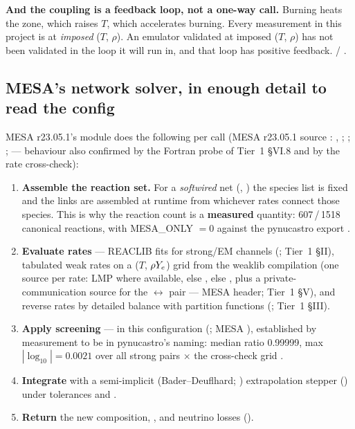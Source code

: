 \textbf{And the coupling is a feedback loop, not a one-way call.} Burning heats
the zone, which raises $T$, which accelerates burning. Every measurement in this
project is at \emph{imposed} ($T$, $\rho$). An emulator validated at imposed
($T$, $\rho$) has not been validated in the loop it will run in, and that loop
has positive feedback.  / .

\subsection{MESA's network solver, in enough detail to read the config}
\label{sec:netsolver}

MESA r23.05.1's  module does the following per call (MESA r23.05.1
source \citep{mesa}:  ,
 ;
; \citealt[\S 6]{paxton2011};
\citealt[\S 10.2]{jermyn2023} --- behaviour also confirmed by the Fortran probe
of Tier~1 \S VI.8 and by the rate cross-check):

\begin{enumerate}
\item \textbf{Assemble the reaction set.} For a \emph{softwired} net
  (, ) the species list is fixed and the
  links are assembled at runtime from whichever rates connect those species.
  This is why the reaction count is a \textbf{measured} quantity: 607\,/\,1518
  canonical reactions, with MESA\_ONLY $= 0$ against the pynucastro export
  .
\item \textbf{Evaluate rates} --- REACLIB fits for strong/EM channels
  (\citealt{cyburt2010}; Tier~1 \S II), tabulated weak rates on a
  ($T$, $\rho Y_{e}$) grid from the weaklib compilation (one source per rate: LMP
  where available, else \citealt{oda1994}, else \citealt{fuller1985}, plus a
  private-communication source for the $\leftrightarrow$
  pair --- MESA  header; Tier~1
  \S V), and reverse rates by detailed balance with partition functions
  (; Tier~1 \S III).
\item \textbf{Apply screening} ---  in this configuration
  (\citealt{chugunov2007}; MESA ), established by
  measurement to be  in pynucastro's naming: median ratio
  0.99999, max $|\log_{10}| = 0.0021$ over all strong pairs $\times$ the
  cross-check grid .
\item \textbf{Integrate} with a semi-implicit (Bader--Deuflhard; \citealt{bader1983}) extrapolation
  stepper () under tolerances  and
  .
\item \textbf{Return} the new composition, \enuc, and neutrino losses
  ().
\end{enumerate}

